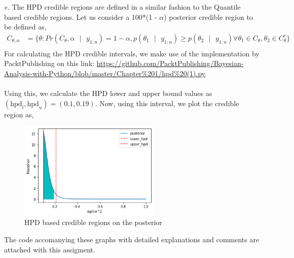\documentclass[11pt]{article}
\begin{document}
\noindent \emph{e.} The HPD credible regions are defined in a similar fashion to the Quantile based credible regions. Let us consider a 100*(1 - $\alpha$) posterior credible region to be defined as,
\begin{equation}
  \nonumber
  \begin{aligned}
    C_{\theta, \alpha} & = \{\theta : Pr(C_{\theta}, \alpha \text{ }|\text{ } y_{1:n}) = 1 - \alpha, p(\theta_{1}\text{ }|\text{ }y_{1:n}) \geq p(\theta_{2}\text{ }|\text{ }y_{1:n}) \forall \theta_{1} \in C_{\theta}, \theta_{2} \in C_{\theta}^{c}\}\\
  \end{aligned}
\end{equation}
For calculating the HPD credible intervals, we make use of the implementation by PacktPublishing
on this link: \url{https://github.com/PacktPublishing/Bayesian-Analysis-with-Python/blob/master/Chapter%201/hpd%20(1).py}\\ \\
Using this, we calculate the HPD lower and upper bound values as $(\text{hpd}_{l}, \text{hpd}_{u}) = (0.1, 0.19)$. Now, using this interval, we plot the credible region as,
\begin{figure}[H]
  \centering
  \includegraphics[width = 0.6\textwidth]{q6e.png}
  \caption{HPD based credible regions on the posterior}
\end{figure}
The code accomanying these graphs with detailed explanations and comments are attached with this assigment.
\end{document}
